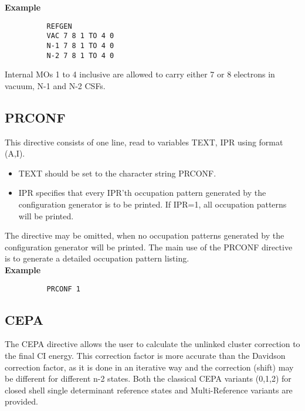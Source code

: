\documentclass[11pt,fleqn]{article}
\begin{document}
{\bf Example}
{
\footnotesize
\begin{verbatim}
          REFGEN
          VAC 7 8 1 TO 4 0
          N-1 7 8 1 TO 4 0
          N-2 7 8 1 TO 4 0
\end{verbatim}
}

 Internal MOs 1 to 4 inclusive are allowed to carry either 7 or 8 electrons
in vacuum, N-1 and N-2 CSFs.


\subsection[PRCONF]{PRCONF}

This directive consists of one line, read to variables TEXT, IPR
using format (A,I).
\begin{itemize}
\item  TEXT should be set to the character string PRCONF.
\item  IPR specifies that every IPR'th occupation pattern
generated by the configuration generator is to be printed.
If IPR=1, all occupation patterns will be printed.
\end{itemize}

 The directive may be omitted, when no occupation patterns generated
by the configuration generator will be printed.
The main use of the PRCONF directive is to generate a detailed
occupation pattern listing.\\

{\bf Example}
{
\footnotesize
\begin{verbatim}
          PRCONF 1
\end{verbatim}
}

\subsection[CEPA]{CEPA}

 The CEPA directive allows the user to calculate the unlinked cluster
correction to the final CI energy. This correction factor is more
accurate than the Davidson correction factor, as it is done in 
an iterative way and the correction (shift) may be different for  
different n-2 states. Both the classical CEPA variants (0,1,2) for
closed shell single determinant reference states and Multi-Reference
variants  are provided.
\end{document}
